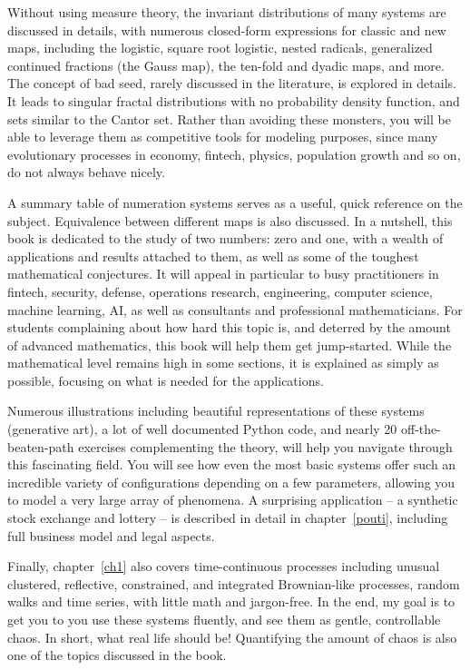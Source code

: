 \documentclass[oneside,10pt]{book}
\begin{document}
Without using measure theory, the invariant distributions of many systems are discussed in details, with numerous closed-form expressions for classic and new
 maps, including the logistic, square root logistic, nested radicals, generalized continued fractions (the Gauss map), the ten-fold and dyadic maps, and more. The concept of bad seed, rarely discussed in the literature, is explored in details. It leads to singular fractal distributions with
 no probability density function, and sets similar to the Cantor set. Rather than avoiding these monsters, you will be able to leverage them
 as competitive tools for modeling purposes, since many evolutionary processes in economy, fintech, physics, population growth and so on, do not always behave nicely. 

A summary table of  numeration systems serves as a useful, quick reference on the subject. Equivalence between different maps is also discussed. In a nutshell, this book is dedicated to the study of two numbers: zero and one, with
 a wealth of applications and results attached to them, as well as some of the toughest mathematical conjectures. It will appeal in particular to busy practitioners  
 in fintech, security, defense, operations research, engineering, computer science, machine learning, AI, as well as consultants
 and professional mathematicians. For students complaining about how hard this topic is, and deterred by the amount of advanced mathematics, this book will help them get jump-started. While the mathematical level remains high in some sections, it is explained as
 simply as possible, focusing on what is needed for the applications.

Numerous illustrations including beautiful representations of these systems (generative art), a lot of well documented Python code, and nearly 20 off-the-beaten-path exercises complementing the theory, will help you navigate through this fascinating field. 
 You will see how even the most basic systems offer such an incredible variety of configurations depending on a few parameters, allowing you
 to model a very large array of phenomena.  A surprising application -- a synthetic stock exchange and lottery -- is described in detail in chapter~\ref{pouti}, including full business model and legal aspects.

Finally, chapter~\ref{ch1}
 also covers time-continuous processes including unusual clustered, reflective, constrained, and integrated Brownian-like processes, random walks and time series, with little math and jargon-free. In the end, my goal is to 
get you to you use these systems fluently, and see them as gentle, controllable chaos. In short, what real life should be! Quantifying the amount
 of chaos is also one of the topics discussed in the book.
\end{document}
